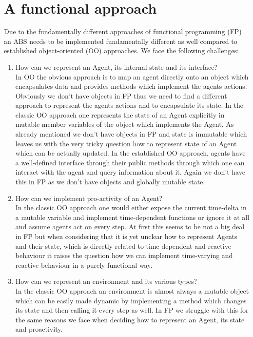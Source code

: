\section{A functional approach}
Due to the fundamentally different approaches of functional programming (FP) an ABS needs to be implemented fundamentally different as well compared to established object-oriented (OO) approaches. We face the following challenges:

\begin{enumerate}
	\item How can we represent an Agent, its internal state and its interface? \\
	In OO the obvious approach is to map an agent directly onto an object which encapsulates data and provides methods which implement the agents actions. Obviously we don't have objects in FP thus we need to find a different approach to represent the agents actions and to encapsulate its state.
	In the classic OO approach one represents the state of an Agent explicitly in mutable member variables of the object which implements the Agent. As already mentioned we don't have objects in FP and state is immutable which leaves us with the very tricky question how to represent state of an Agent which can be actually updated.
	In the established OO approach, agents have a well-defined interface through their public methods through which one can interact with the agent and query information about it. Again we don't have this in FP as we don't have objects and globally mutable state.
	
	\item How can we implement pro-activity of an Agent? \\
	In the classic OO approach one would either expose the current time-delta in a mutable variable and implement time-dependent functions or ignore it at all and assume agents act on every step. At first this seems to be not a big deal in FP but when considering that it is yet unclear how to represent Agents and their state, which is directly related to time-dependent and reactive behaviour it raises the question how we can implement time-varying and reactive behaviour in a purely functional way.
	
	\item How can we represent an environment and its various types? \\
	In the classic OO approach an environment is almost always a mutable object which can be easily made dynamic by implementing a method which changes its state and then calling it every step as well. In FP we struggle with this for the same reasons we face when deciding how to represent an Agent, its state and proactivity.
	

\end{enumerate}
